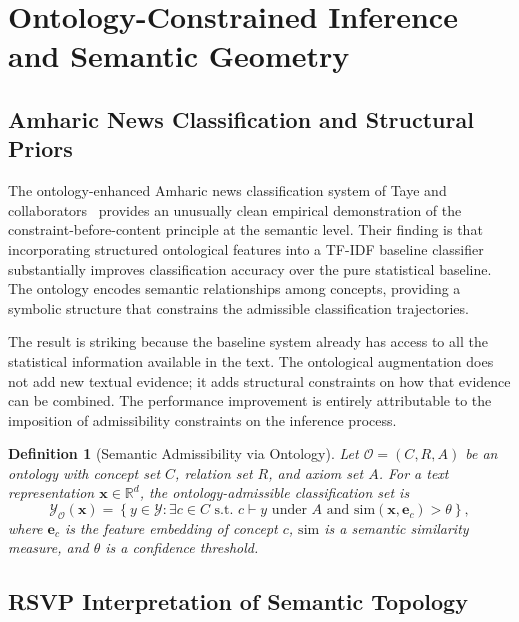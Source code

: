 \documentclass[11pt, oneside]{article}
\numberwithin{equation}{section}
\theoremstyle{rsvpstyle}
\newtheorem{definition}[theorem]{Definition}
\theoremstyle{remark}
\newcommand{\Rspace}{\mathbb{R}}
\begin{document}
\section{Ontology-Constrained Inference and Semantic Geometry}

\subsection{Amharic News Classification and Structural Priors}

The ontology-enhanced Amharic news classification system of Taye and
collaborators~\cite{Taye2026Amharic} provides an unusually clean empirical
demonstration of the constraint-before-content principle at the semantic level.
Their finding is that incorporating structured ontological features into a TF-IDF
baseline classifier substantially improves classification accuracy over the pure
statistical baseline. The ontology encodes semantic relationships among concepts,
providing a symbolic structure that constrains the admissible classification trajectories.

The result is striking because the baseline system already has access to all the
statistical information available in the text. The ontological augmentation does not
add new textual evidence; it adds structural constraints on how that evidence can be
combined. The performance improvement is entirely attributable to the imposition of
admissibility constraints on the inference process.

\begin{definition}[Semantic Admissibility via Ontology]
Let $\mathcal{O} = (C, R, A)$ be an ontology with concept set $C$, relation set $R$,
and axiom set $A$. For a text representation $\mathbf{x} \in \Rspace^d$, the
ontology-admissible classification set is
\begin{equation}
  \mathcal{Y}_\mathcal{O}(\mathbf{x}) = \left\{ y \in \mathcal{Y} : \exists c \in C \text{ s.t. }
  c \vdash y \text{ under } A \text{ and } \text{sim}(\mathbf{x}, \mathbf{e}_c) > \theta \right\},
\end{equation}
where $\mathbf{e}_c$ is the feature embedding of concept $c$, $\text{sim}$ is a
semantic similarity measure, and $\theta$ is a confidence threshold.
\end{definition}

\subsection{RSVP Interpretation of Semantic Topology}
\end{document}
